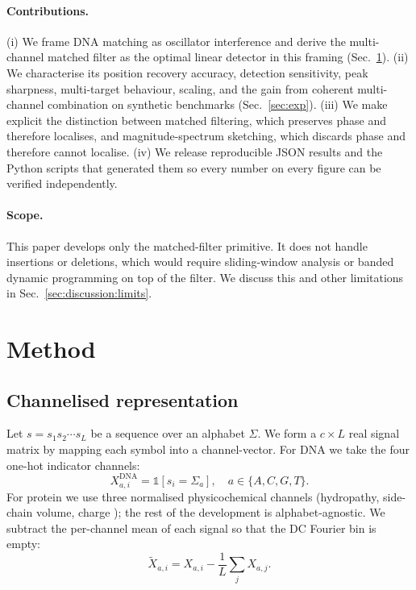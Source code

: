 \documentclass[11pt,a4paper]{article}
\theoremstyle{definition}
\theoremstyle{remark}
\begin{document}
\paragraph{Contributions.} (i) We frame DNA matching as oscillator
interference and derive the multi-channel matched filter as the
optimal linear detector in this framing
(Sec.~\ref{sec:method}). (ii) We characterise its position recovery
accuracy, detection sensitivity, peak sharpness, multi-target
behaviour, scaling, and the gain from coherent multi-channel
combination on synthetic benchmarks
(Sec.~\ref{sec:exp}). (iii) We make explicit the
distinction between matched filtering, which preserves phase and
therefore localises, and magnitude-spectrum sketching, which discards
phase and therefore cannot localise. (iv) We release reproducible
JSON results and the Python scripts that generated them so every
number on every figure can be verified independently.

\paragraph{Scope.} This paper develops only the matched-filter primitive.
It does not handle insertions or deletions, which would require
sliding-window analysis or banded dynamic programming on top of the
filter. We discuss this and other limitations in
Sec.~\ref{sec:discussion:limits}.

\section{Method}
\label{sec:method}

\subsection{Channelised representation}

Let $s = s_1 s_2 \cdots s_L$ be a sequence over an alphabet $\Sigma$. We
form a $c \times L$ real signal matrix by mapping each symbol into a
channel-vector. For DNA we take the four one-hot indicator channels:
\begin{equation}
    X^{\text{DNA}}_{a, i} = \mathbb{1}[s_i = \Sigma_a], \quad a \in \{A, C, G, T\}.
\end{equation}
For protein we use three normalised physicochemical channels
(hydropathy, side-chain volume, charge \citep{kyte1982}); the rest of
the development is alphabet-agnostic. We subtract the per-channel mean
of each signal so that the DC Fourier bin is empty:
\begin{equation}
    \tilde X_{a, i} = X_{a, i} - \frac{1}{L}\sum_j X_{a,j}.
\end{equation}
\end{document}
